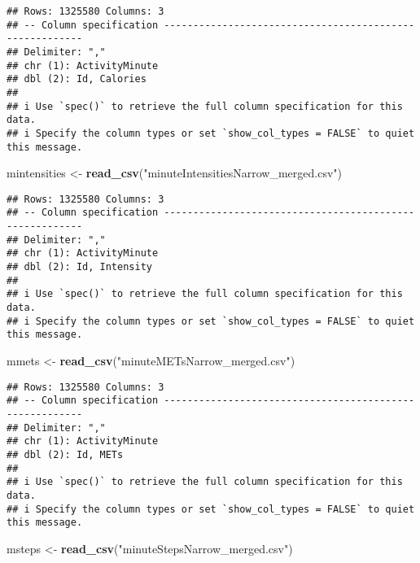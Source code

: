 \documentclass[
]{article}
\newenvironment{Shaded}{\begin{snugshade}}{\end{snugshade}}
\newcommand{\FunctionTok}[1]{\textcolor[rgb]{0.13,0.29,0.53}{\textbf{#1}}}
\newcommand{\NormalTok}[1]{#1}
\newcommand{\OtherTok}[1]{\textcolor[rgb]{0.56,0.35,0.01}{#1}}
\newcommand{\StringTok}[1]{\textcolor[rgb]{0.31,0.60,0.02}{#1}}
\begin{document}
\begin{verbatim}
## Rows: 1325580 Columns: 3
## -- Column specification --------------------------------------------------------
## Delimiter: ","
## chr (1): ActivityMinute
## dbl (2): Id, Calories
## 
## i Use `spec()` to retrieve the full column specification for this data.
## i Specify the column types or set `show_col_types = FALSE` to quiet this message.
\end{verbatim}

\begin{Shaded}
\begin{Highlighting}[]
\NormalTok{mintensities }\OtherTok{\textless{}{-}} \FunctionTok{read\_csv}\NormalTok{(}\StringTok{"minuteIntensitiesNarrow\_merged.csv"}\NormalTok{)}
\end{Highlighting}
\end{Shaded}

\begin{verbatim}
## Rows: 1325580 Columns: 3
## -- Column specification --------------------------------------------------------
## Delimiter: ","
## chr (1): ActivityMinute
## dbl (2): Id, Intensity
## 
## i Use `spec()` to retrieve the full column specification for this data.
## i Specify the column types or set `show_col_types = FALSE` to quiet this message.
\end{verbatim}

\begin{Shaded}
\begin{Highlighting}[]
\NormalTok{mmets }\OtherTok{\textless{}{-}} \FunctionTok{read\_csv}\NormalTok{(}\StringTok{"minuteMETsNarrow\_merged.csv"}\NormalTok{)}
\end{Highlighting}
\end{Shaded}

\begin{verbatim}
## Rows: 1325580 Columns: 3
## -- Column specification --------------------------------------------------------
## Delimiter: ","
## chr (1): ActivityMinute
## dbl (2): Id, METs
## 
## i Use `spec()` to retrieve the full column specification for this data.
## i Specify the column types or set `show_col_types = FALSE` to quiet this message.
\end{verbatim}

\begin{Shaded}
\begin{Highlighting}[]
\NormalTok{msteps }\OtherTok{\textless{}{-}} \FunctionTok{read\_csv}\NormalTok{(}\StringTok{"minuteStepsNarrow\_merged.csv"}\NormalTok{)}
\end{Highlighting}
\end{Shaded}
\end{document}
